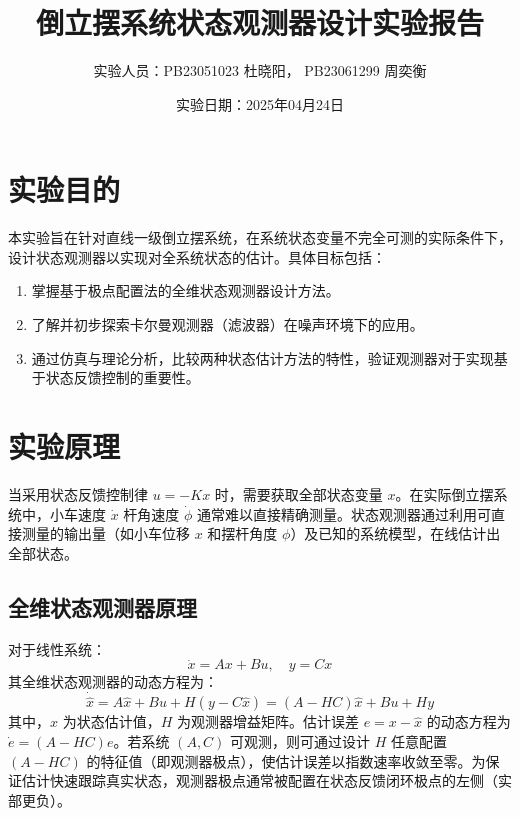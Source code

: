 \documentclass[a4paper, 12pt]{ctexart}
\title{\vspace{2cm}\textbf{\Huge 倒立摆系统状态观测器设计实验报告}}
\author{\Large 实验人员：PB23051023 杜晓阳， PB23061299 周奕衡}
\date{\large 实验日期：2025年04月24日}
\begin{document}
\maketitle
\thispagestyle{empty} %

\newpage
\setcounter{page}{1}

\section{实验目的}
本实验旨在针对直线一级倒立摆系统，在系统状态变量不完全可测的实际条件下，设计状态观测器以实现对全系统状态的估计。具体目标包括：
\begin{enumerate}
    \item 掌握基于极点配置法的全维状态观测器设计方法。
    \item 了解并初步探索卡尔曼观测器（滤波器）在噪声环境下的应用。
    \item 通过仿真与理论分析，比较两种状态估计方法的特性，验证观测器对于实现基于状态反馈控制的重要性。
\end{enumerate}

\section{实验原理}
当采用状态反馈控制律 $u = -Kx$ 时，需要获取全部状态变量 $x$。在实际倒立摆系统中，小车速度 $\dot{x}$ 杆角速度 $\dot{\phi}$ 通常难以直接精确测量。状态观测器通过利用可直接测量的输出量（如小车位移 $x$ 和摆杆角度 $\phi$）及已知的系统模型，在线估计出全部状态。

\subsection{全维状态观测器原理}
对于线性系统：
\begin{equation}
    \dot{x} = Ax + Bu, \quad y = Cx
\end{equation}
其全维状态观测器的动态方程为：
\begin{equation}
    \dot{\hat{x}} = A\hat{x} + Bu + H(y - C\hat{x}) = (A-HC)\hat{x} + Bu + Hy
\end{equation}
其中，$\hat{x}$ 为状态估计值，$H$ 为观测器增益矩阵。估计误差 $e = x - \hat{x}$ 的动态方程为 $\dot{e} = (A-HC)e$。若系统 $(A, C)$ 可观测，则可通过设计 $H$ 任意配置 $(A-HC)$ 的特征值（即观测器极点），使估计误差以指数速率收敛至零。为保证估计快速跟踪真实状态，观测器极点通常被配置在状态反馈闭环极点的左侧（实部更负）。
\end{document}
